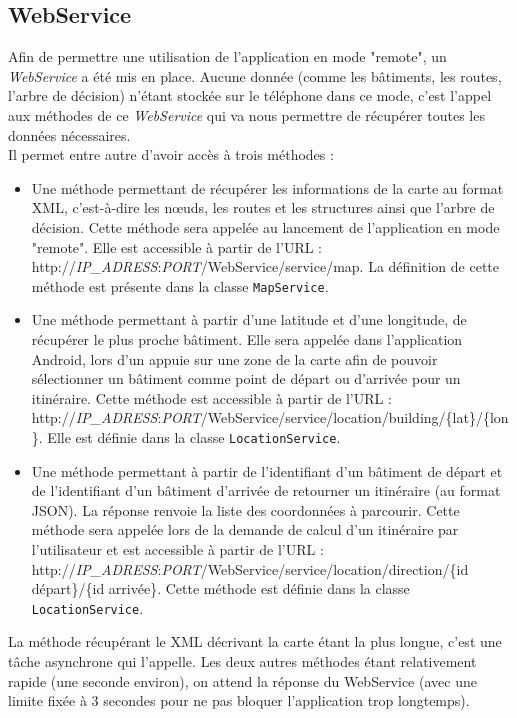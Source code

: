 \documentclass[12pt,a4paper,oneside]{article}
\begin{document}
\newpage

\subsection{WebService}
Afin de permettre une utilisation de l'application en mode "remote", un \textit{WebService} a été mis en place. Aucune donnée (comme les bâtiments, les routes, l'arbre de décision) n'étant stockée sur le téléphone dans ce mode, c'est l'appel aux méthodes de ce \textit{WebService} qui va nous permettre de récupérer toutes les données nécessaires. \\
Il permet entre autre d'avoir accès à trois méthodes :\\
\begin{itemize}
\item Une méthode permettant de récupérer les informations de la carte au format XML, c'est-à-dire les nœuds, les routes et les structures ainsi que l'arbre de décision. Cette méthode sera appelée au lancement de l'application en mode "remote". Elle est accessible à partir de l'URL : http://\textit{IP\_ADRESS}:\textit{PORT}/WebService/service/map. La définition de cette méthode est présente dans la classe \texttt{MapService}.
\item Une méthode permettant à partir d'une latitude et d'une longitude, de récupérer le plus proche bâtiment. Elle sera appelée dans l'application Android, lors d'un appuie sur une zone de la carte afin de pouvoir sélectionner un bâtiment comme point de départ ou d'arrivée pour un itinéraire. Cette méthode est accessible à partir de l'URL : http://\textit{IP\_ADRESS}:\textit{PORT}/WebService/service/location/building/\{lat\}/\{lon\}. Elle est définie dans la classe \texttt{LocationService}.
\item Une méthode permettant à partir de l'identifiant d'un bâtiment de départ et de l'identifiant d'un bâtiment d'arrivée de retourner un itinéraire (au format JSON). La réponse renvoie la liste des coordonnées à parcourir. Cette méthode sera appelée lors de la demande de calcul d'un itinéraire par l'utilisateur et est accessible à partir de l'URL : http://\textit{IP\_ADRESS}:\textit{PORT}/WebService/service/location/direction/\{id départ\}/\{id arrivée\}. Cette méthode est définie dans la classe \texttt{LocationService}.\\
\end{itemize}

La méthode récupérant le XML décrivant la carte étant la plus longue, c'est une tâche asynchrone qui l'appelle. Les deux autres méthodes étant relativement rapide (une seconde environ), on attend la réponse du WebService (avec une limite fixée à 3 secondes pour ne pas bloquer l'application trop longtemps). 
\end{document}
